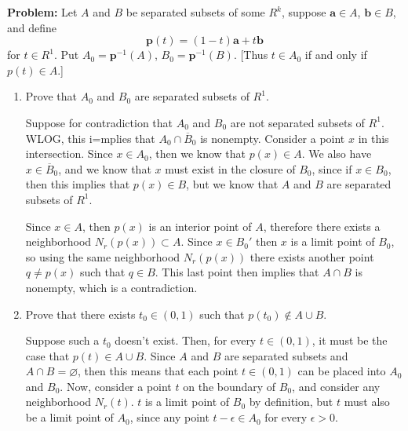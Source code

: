 \documentclass[10pt]{article}
\newenvironment{problem}{\textbf{Problem:}}{}
\begin{document}
	\begin{problem}
		Let \( A \) and \( B \) be separated subsets of some \( R^{k} \), suppose \( \mathbf a \in A \), 
		\( \mathbf b \in B \), and define
		\[
		\mathbf p(t) = (1 - t) \mathbf a + t \mathbf b
		\] 
		for \( t \in R^{1} \). Put \( A_0 = \mathbf p^{-1}(A) \), \( B_0 = \mathbf p^{-1}(B) \). [Thus 
		\( t \in A_0 \) if and only if \( p(t) \in A \).]
		\begin{enumerate}[label=\alph*)]
			\item Prove that \( A_0 \) and \( B_0 \) are separated subsets of \( R^{1} \). 

				\begin{solution}
					Suppose for contradiction that \( A_0 \) and \( B_0 \) are not separated subsets of \( R^{1} \). 
					WLOG, this i=mplies that \( A_0 \cap \overline B_0 \) is nonempty. Consider
					a point \( x \) in this intersection. Since \( x \in A_0 \), then 
					we know that \( p(x) \in A \). We also have \( x \in \overline B_0 \), and we know that 
					\( x  \) must exist in the closure of \( B_0 \), since if \( x \in B_0 \), then this 
					implies that \( p(x) \in B \), but we know that \( A \) and \( B \) are separated
					subsets of \( R^{1} \). 

					Since \( x \in A \), then \( p(x) \) is an interior point of \( A \), 
					therefore there exists a neighborhood \( N_r(p(x)) \subset A \). 
					Since \( x \in B_0' \) then \( x \) is a limit point of \( B_0 \), so using the same 
					neighborhood \( N_r(p(x)) \) there exists another point \( q \neq p(x) \) such that 
					\( q \in B \). This last point then implies that \( A \cap B \) is nonempty, 
					which is a contradiction. 
				\end{solution}
			\item Prove that there exists \( t_0 \in (0, 1) \) such that \( p(t_0) \not \in A \cup B \). 

				\begin{solution}
					Suppose such a \( t_0 \) doesn't exist. Then, for every \( t \in (0, 1) \), it must be the 
					case that \( p(t) \in A \cup B \). Since \( A \) and \( B \) are separated 
					subsets and \( A \cap B = \varnothing \), then this means that each point \( t \in (0, 1) \) 
					can be placed into \( A_0  \) and \( B_0 \). Now, consider a point 
					\( t \) on the boundary of \( B_0 \), and consider any neighborhood \( N_r(t) \). \( t \) is 
					a limit point of \( B_0 \) by definition, but \( t \) must also be a limit point of \( A_0 \),
					since any point \( t - \epsilon \in A_0 \) for every \( \epsilon > 0 \). 


\end{solution}
\end{enumerate}
\end{problem}
\end{document}
